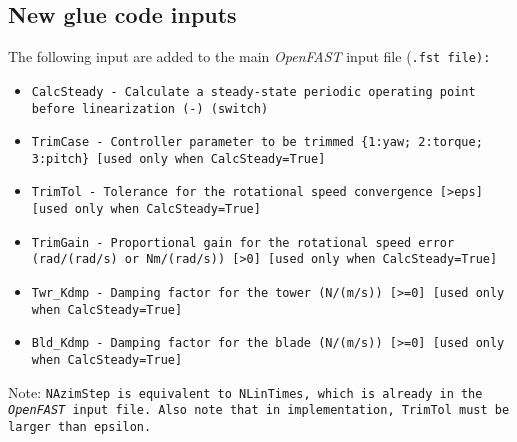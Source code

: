 \documentclass[11pt]{article}
\newcommand{\question}[1]{{\color{red}{#1}}}
\begin{document}
\subsection{New glue code inputs}
\label{sec:newinputs}
The following input are added to the main \textit{OpenFAST} input file (\tt{.fst} file):
\begin{itemize}\tightlist
    \item \tt{CalcSteady - Calculate a steady-state periodic operating point before linearization (-) (switch)}
    \item \tt{TrimCase - Controller parameter to be trimmed \{1:yaw; 2:torque; 3:pitch\} [used only when CalcSteady=True]}
    \item \tt{TrimTol - Tolerance for the rotational speed convergence [>eps] [used only when CalcSteady=True] }
    \item \tt{TrimGain - Proportional gain for the rotational speed error (rad/(rad/s) or Nm/(rad/s)) [>0] [used only when CalcSteady=True] }
    \item \tt{Twr\_Kdmp - Damping factor for the tower (N/(m/s)) [>=0] [used only when CalcSteady=True] }
    \item \tt{Bld\_Kdmp - Damping factor for the blade (N/(m/s)) [>=0] [used only when CalcSteady=True] }
\end{itemize}

Note: \tt{NAzimStep} is equivalent to \tt{NLinTimes}, which is already in the \textit{OpenFAST} input file. Also note that in implementation,
\tt{TrimTol} must be larger than epsilon. \question{or maybe we should require it to be even larger?}
\end{document}
